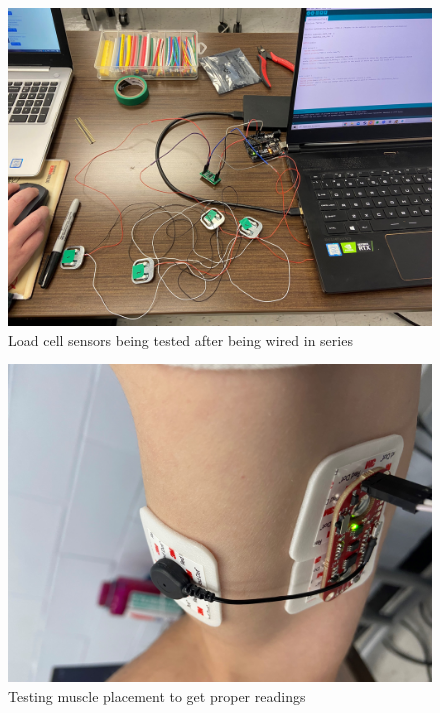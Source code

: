 \documentclass[11pt,letterpaper]{article}
\begin{document}
\begin{figure}[htbp]
\centering
\includegraphics[scale=0.1]{Progress_Report/figs/Loadcell_sensors.jpg}
\caption{Load cell sensors being tested after being wired in series}
\label{fig:loadcell}
\end{figure}
\begin{figure}[htbp]
\centering
\includegraphics[scale=0.1]{Progress_Report/figs/SensorPlacement.jpg}
\caption{Testing muscle placement to get proper readings}
\label{fig:sensorplacement}
\end{figure}


\end{document}
